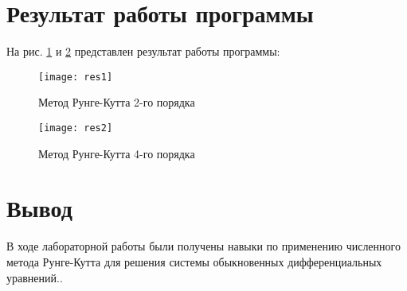 \documentclass[a4paper, 14pt]{article}
\begin{document}
\section{Результат работы программы}

На рис. \ref{fig:res1} и  \ref{fig:res2} представлен результат работы программы:
	
	\begin{figure}[H]
        	\begin{center}
        		\texttt{[image: res1]}
        		\caption{Метод Рунге-Кутта 2-го порядка}
        		\label{fig:res1}
        	\end{center}
        \end{figure}
        
        \begin{figure}[H]
        	\begin{center}
        		\texttt{[image: res2]}
        		\caption{Метод Рунге-Кутта 4-го порядка}
        		\label{fig:res2}
        	\end{center}
        \end{figure}

\section*{Вывод}

В ходе лабораторной работы были получены навыки по применению численного метода Рунге-Кутта для решения системы обыкновенных дифференциальных уравнений..
\end{document}
